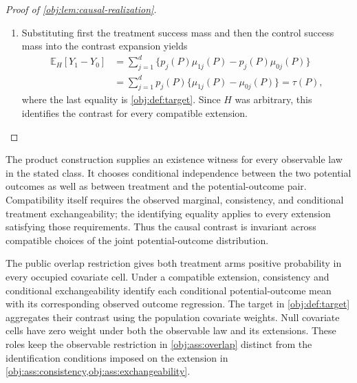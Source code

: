 \documentclass[11pt]{article}
\begin{document}
\begin{proof}[Proof of \cref{obj:lem:causal-realization}]
\begin{enumerate}
Next suppose \(p_j(P)>0\). Model membership in
\cref{obj:def:model} supplies \cref{obj:ass:overlap}, so
\[
s_{1j}(P)=p_j(P)e_j(P)\ge\epsilon p_j(P)>0,
\qquad
s_{0j}(P)=p_j(P)\{1-e_j(P)\}\ge\epsilon p_j(P)>0.
\]
Dividing the preceding success identity by the positive arm mass
therefore gives
\[
\eta^H_{aj}
=p_j(P)\frac{q_{aj}(P)}{s_{aj}(P)}
=p_j(P)\mu_{aj}(P).
\]
The two cases establish this identity for every cell and both arms.

\item
Substituting first the treatment success mass and then the control
success mass into the contrast expansion yields
\[
\begin{aligned}
\mathbb E_H[Y_1-Y_0]
&=\sum_{j=1}^{d}
 \bigl\{p_j(P)\mu_{1j}(P)-p_j(P)\mu_{0j}(P)\bigr\}\\
&=\sum_{j=1}^{d}p_j(P)
 \bigl\{\mu_{1j}(P)-\mu_{0j}(P)\bigr\}
=\tau(P),
\end{aligned}
\]
where the last equality is \cref{obj:def:target}. Since \(H\) was
arbitrary, this identifies the contrast for every compatible
extension.
\end{enumerate}
\end{proof}

The product construction supplies an existence witness for every observable law in the stated class. It chooses conditional independence between the two potential outcomes as well as between treatment and the potential-outcome pair. Compatibility itself requires the observed marginal, consistency, and conditional treatment exchangeability; the identifying equality applies to every extension satisfying those requirements. Thus the causal contrast is invariant across compatible choices of the joint potential-outcome distribution.

The public overlap restriction gives both treatment arms positive probability in every occupied covariate cell. Under a compatible extension, consistency and conditional exchangeability identify each conditional potential-outcome mean with its corresponding observed outcome regression. The target in \cref{obj:def:target} aggregates their contrast using the population covariate weights. Null covariate cells have zero weight under both the observable law and its extensions. These roles keep the observable restriction in \cref{obj:ass:overlap} distinct from the identification conditions imposed on the extension in \cref{obj:ass:consistency,obj:ass:exchangeability}.
\end{document}
